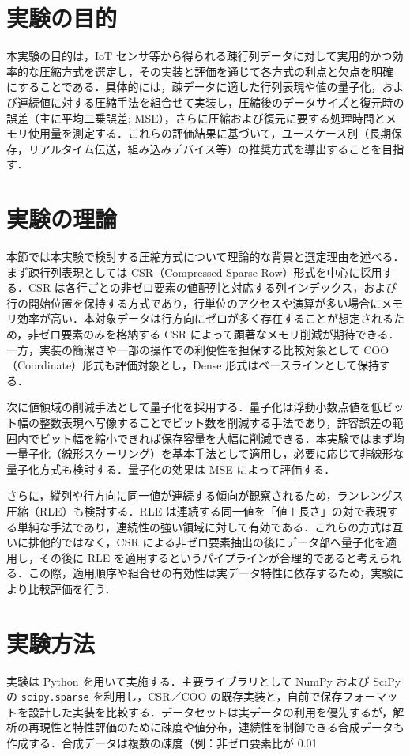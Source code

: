 \section{実験の目的}
本実験の目的は，IoT センサ等から得られる疎行列データに対して実用的かつ効率的な圧縮方式を選定し，その実装と評価を通じて各方式の利点と欠点を明確にすることである．具体的には，疎データに適した行列表現や値の量子化，および連続値に対する圧縮手法を組合せて実装し，圧縮後のデータサイズと復元時の誤差（主に平均二乗誤差; MSE），さらに圧縮および復元に要する処理時間とメモリ使用量を測定する．これらの評価結果に基づいて，ユースケース別（長期保存，リアルタイム伝送，組み込みデバイス等）の推奨方式を導出することを目指す．

\section{実験の理論}
本節では本実験で検討する圧縮方式について理論的な背景と選定理由を述べる．まず疎行列表現としては CSR（Compressed Sparse Row）形式を中心に採用する．CSR は各行ごとの非ゼロ要素の値配列と対応する列インデックス，および行の開始位置を保持する方式であり，行単位のアクセスや演算が多い場合にメモリ効率が高い．本対象データは行方向にゼロが多く存在することが想定されるため，非ゼロ要素のみを格納する CSR によって顕著なメモリ削減が期待できる．一方，実装の簡潔さや一部の操作での利便性を担保する比較対象として COO（Coordinate）形式も評価対象とし，Dense 形式はベースラインとして保持する．

次に値領域の削減手法として量子化を採用する．量子化は浮動小数点値を低ビット幅の整数表現へ写像することでビット数を削減する手法であり，許容誤差の範囲内でビット幅を縮小できれば保存容量を大幅に削減できる．本実験ではまず均一量子化（線形スケーリング）を基本手法として適用し，必要に応じて非線形な量子化方式も検討する．量子化の効果は MSE によって評価する．

さらに，縦列や行方向に同一値が連続する傾向が観察されるため，ランレングス圧縮（RLE）も検討する．RLE は連続する同一値を「値＋長さ」の対で表現する単純な手法であり，連続性の強い領域に対して有効である．これらの方式は互いに排他的ではなく，CSR による非ゼロ要素抽出の後にデータ部へ量子化を適用し，その後に RLE を適用するというパイプラインが合理的であると考えられる．この際，適用順序や組合せの有効性は実データ特性に依存するため，実験により比較評価を行う．

\section{実験方法}
実験は Python を用いて実施する．主要ライブラリとして NumPy および SciPy の \texttt{scipy.sparse} を利用し，CSR／COO の既存実装と，自前で保存フォーマットを設計した実装を比較する．データセットは実データの利用を優先するが，解析の再現性と特性評価のために疎度や値分布，連続性を制御できる合成データも作成する．合成データは複数の疎度（例：非ゼロ要素比が 0.01%

